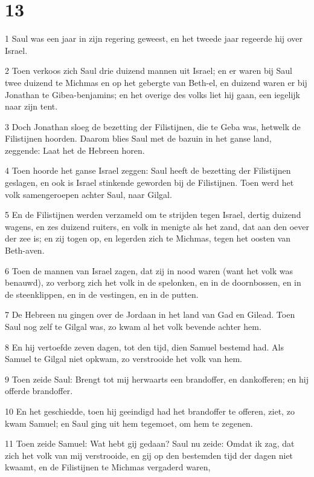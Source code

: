 \chapter{13}

\par 1 Saul was een jaar in zijn regering geweest, en het tweede jaar regeerde hij over Israel.
\par 2 Toen verkoos zich Saul drie duizend mannen uit Israel; en er waren bij Saul twee duizend te Michmas en op het gebergte van Beth-el, en duizend waren er bij Jonathan te Gibea-benjamins; en het overige des volks liet hij gaan, een iegelijk naar zijn tent.
\par 3 Doch Jonathan sloeg de bezetting der Filistijnen, die te Geba was, hetwelk de Filistijnen hoorden. Daarom blies Saul met de bazuin in het ganse land, zeggende: Laat het de Hebreen horen.
\par 4 Toen hoorde het ganse Israel zeggen: Saul heeft de bezetting der Filistijnen geslagen, en ook is Israel stinkende geworden bij de Filistijnen. Toen werd het volk samengeroepen achter Saul, naar Gilgal.
\par 5 En de Filistijnen werden verzameld om te strijden tegen Israel, dertig duizend wagens, en zes duizend ruiters, en volk in menigte als het zand, dat aan den oever der zee is; en zij togen op, en legerden zich te Michmas, tegen het oosten van Beth-aven.
\par 6 Toen de mannen van Israel zagen, dat zij in nood waren (want het volk was benauwd), zo verborg zich het volk in de spelonken, en in de doornbossen, en in de steenklippen, en in de vestingen, en in de putten.
\par 7 De Hebreen nu gingen over de Jordaan in het land van Gad en Gilead. Toen Saul nog zelf te Gilgal was, zo kwam al het volk bevende achter hem.
\par 8 En hij vertoefde zeven dagen, tot den tijd, dien Samuel bestemd had. Als Samuel te Gilgal niet opkwam, zo verstrooide het volk van hem.
\par 9 Toen zeide Saul: Brengt tot mij herwaarts een brandoffer, en dankofferen; en hij offerde brandoffer.
\par 10 En het geschiedde, toen hij geeindigd had het brandoffer te offeren, ziet, zo kwam Samuel; en Saul ging uit hem tegemoet, om hem te zegenen.
\par 11 Toen zeide Samuel: Wat hebt gij gedaan? Saul nu zeide: Omdat ik zag, dat zich het volk van mij verstrooide, en gij op den bestemden tijd der dagen niet kwaamt, en de Filistijnen te Michmas vergaderd waren,
